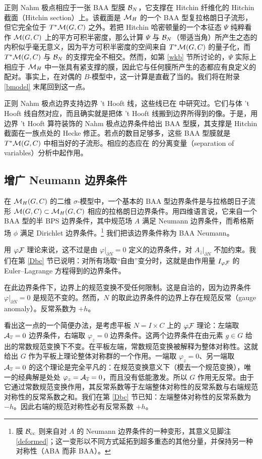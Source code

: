 正则 Nahm 极点相应于一张 BAA 型膜 ${\mathcal B}_N$，它支撑在 Hitchin 纤维化的 Hitchin 截面（Hitchin section）上。该截面是 ${\mathcal M}_H$ 的一个 BAA 型复拉格朗日子流形，但它完全位于 $T^*{\mathcal M}(G,C)$ 之外。若把 Hitchin 哈密顿量的一个本征态 $\Psi$ 纯粹看作 ${\mathcal M}(G,C)$ 上的平方可积半密度，那么计算 $\Psi$ 与 ${\mathcal B}_N$（带适当角）所产生之态的内积似乎毫无意义，因为平方可积半密度的空间来自 $T^*{\mathcal M}(G,C)$ 的量子化，而 $T^*{\mathcal M}(G,C)$ 与 ${\mathcal B}_N$ 的支撑完全不相交。然而，如第 \ref{wkb} 节所讨论的，$\Psi$ 实际上相应于 ${\mathcal M}_H$ 中一张具有紧支撑的膜，因此它与任何膜所产生的态都应有良定义的配对。事实上，在对偶的 $B$-模型中，这一计算是直截了当的。我们将在附录 \ref{bmodel} 末尾回到这一点。

正则 Nahm 极点边界支持边界 't Hooft 线，这些线已在 \cite{Witten:2011zz} 中研究过。它们与体 't Hooft 线自然对应，而且确实就是把体 't Hooft 线搬到边界所得到的像。于是，用边界 't Hooft 算符装饰的 Nahm 极点边界条件给出 BAA 型膜，其支撑是 Hitchin 截面在一族点处的 Hecke 修正。若点的数目足够多，这些 BAA 型膜就是 $T^*{\mathcal M}(G,C)$ 中相当好的子流形。相应的态应在 \cite{T} 的分离变量（separation of variables）分析中起作用。

\subsection{增广 Neumann 边界条件}\label{Enriched}

在 ${\mathcal M}_H(G,C)$ 的二维 $\sigma$-模型中，一个基本的 BAA 型边界条件是与拉格朗日子流形 ${\mathcal M}(G,C)\subset {\mathcal M}_H(G,C)$ 相应的拉格朗日边界条件。用四维语言说，它来自一个 BAA 型的半 BPS 边界条件，其中规范场 $A$ 满足 Neumann 边界条件，而希格斯场 $\phi$ 满足 Dirichlet 边界条件。\footnote{膜 ${\mathcal B}_{\mathrm{cc}}$ 则来自对 $A$ 的 Neumann 边界条件的一种变形，其意义见脚注 \ref{deformed}；这一变形以不同方式延拓到超多重态的其他分量，并保持另一种对称性（ABA 而非 BAA）。} 我们把该边界条件称为 BAA Neumann。

用 $\varphi{\mathcal F}$ 理论来说，这不过是由 $\varphi|_{\partial N}=0$ 定义的边界条件，对 $A_{\bar z}|_{\partial N}$ 不加约束。我们在第 \ref{Dbc} 节已说明：对所有场取“自由”变分时，这就是由作用量 $I_{\varphi{\mathcal F}}$ 的 Euler–Lagrange 方程得到的边界条件。

在此边界条件下，边界上的规范变换不受任何限制。这是自洽的，因为边界条件 $\varphi|_{\partial N}=0$ 是规范不变的。然而，$N$ 的取此边界条件的边界上存在规范反常（gauge anomaly）。反常系数为 $+h$。

看出这一点的一个简便办法，是考虑平板 $N=I\times C$ 上的 $\varphi{\mathcal F}$ 理论：左端取 ${\mathcal A}_{\overline z}=0$ 边界条件，右端取 $\varphi_z=0$ 边界条件。这两个边界条件在由元素 $g\in G$ 给出的常数规范变换下不变。在平板左端，常数规范变换被解释为整体对称性。这就给出 $G$ 作为平板上理论整体对称群的一个作用。一端取 $\varphi_z=0$、另一端取 ${\mathcal A}_{\overline z}=0$ 的这个理论是完全平凡的：在规范变换意义下（模去一个规范变换），唯一的经典解是处处 $\varphi_z={\mathcal A}_{\overline z}=0$，而且没有低能激发。所以 $G$ 作用无反常。由于它通过常数规范变换作用，其反常系数等于左端整体对称性的反常系数与右端规范对称性的反常系数之和。我们在第 \ref{Dbc} 节已知：左端整体对称性的反常系数为 $-h$。因此右端的规范对称性必有反常系数 $+h$。

